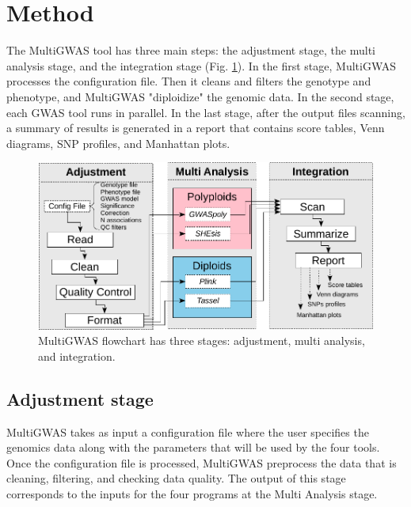 \section{Method}

The MultiGWAS tool has three main steps: the adjustment stage, the multi analysis stage, and the integration stage (Fig. \ref{pipeline}). In the first stage, MultiGWAS processes the configuration file. Then it cleans and filters the genotype and phenotype, and  MultiGWAS "diploidize" the genomic data. In the second stage, each GWAS tool runs in parallel. In the last stage, after the output files scanning, a summary of results is generated in a report that contains score tables, Venn diagrams, SNP profiles, and Manhattan plots. 

\begin{figure}
\includegraphics[width=12cm]{images/multi-gwas-flowchart-horizontal-stages-config.pdf}
\caption{MultiGWAS flowchart has three stages: adjustment, multi analysis, and integration.\label{pipeline}}

\end{figure}

\subsection{Adjustment stage} 
MultiGWAS takes as input a configuration file where the user specifies the genomics data along with the parameters that will be used by the four tools. Once the configuration file is processed, MultiGWAS preprocess the data that is cleaning, filtering, and checking data quality. The output of this stage corresponds to the inputs for the four programs at the Multi Analysis stage.


 
